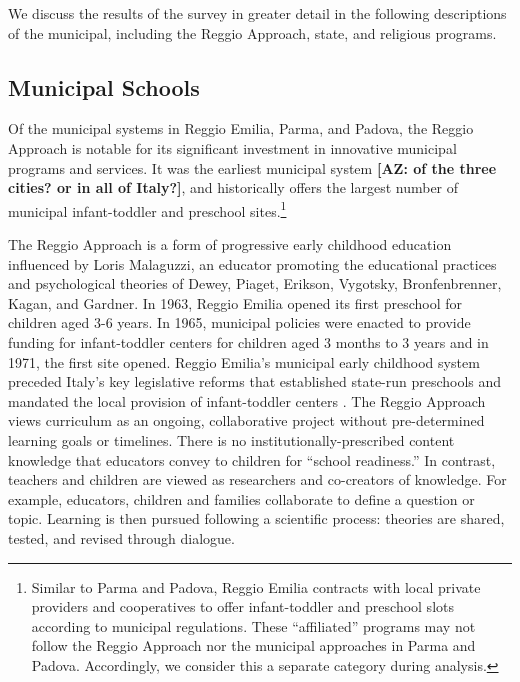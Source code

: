 We discuss the results of the survey in greater detail in the following descriptions of the municipal, including the Reggio Approach, state, and religious programs.

\subsection{Municipal Schools}

Of the municipal systems in Reggio Emilia, Parma, and Padova, the Reggio Approach is notable for its significant investment in innovative municipal programs and services. It was the earliest municipal system \textbf{[AZ: of the three cities? or in all of Italy?]}, and historically offers the largest number of municipal infant-toddler and preschool sites.\footnote{Similar to Parma and Padova, Reggio Emilia contracts with local private providers and cooperatives to offer infant-toddler and preschool slots according to municipal regulations. These ``affiliated'' programs may not follow the Reggio Approach nor the municipal approaches in Parma and Padova. Accordingly, we consider this a separate category during analysis.} 


The Reggio Approach is a form of progressive early childhood education influenced by Loris Malaguzzi, an educator promoting the educational practices and psychological theories of Dewey, Piaget, Erikson, Vygotsky, Bronfenbrenner, Kagan, and Gardner. In 1963, Reggio Emilia opened its first preschool for children aged 3-6 years. In 1965, municipal policies were enacted to provide funding for infant-toddler centers for children aged 3 months to 3 years and in 1971, the first site opened. Reggio Emilia's municipal early childhood system preceded Italy's key legislative reforms that established state-run preschools and mandated the local provision of infant-toddler centers \citep{Cagliari-etal-eds_2016_BOOK_Loris-Malaguzzi}. The Reggio Approach views curriculum as an ongoing, collaborative project without pre-determined learning goals or timelines. There is no institutionally-prescribed content knowledge that educators convey to children for ``school readiness.'' In contrast, teachers and children are viewed as researchers and co-creators of knowledge. For example, educators, children and families collaborate to define a question or topic. Learning is then pursued following a scientific process: theories are shared, tested, and revised through dialogue. 

